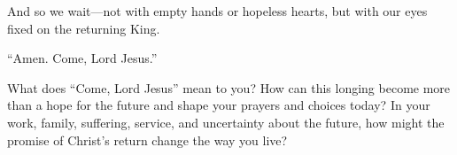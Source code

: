 And so we wait—not with empty hands or hopeless hearts, but with our eyes fixed on the returning King.

``Amen. Come, Lord Jesus.''

\begin{ReaderQuestion}
What does ``Come, Lord Jesus'' mean to you? How can this longing become more than a hope for the future and shape your prayers and choices today? In your work, family, suffering, service, and uncertainty about the future, how might the promise of Christ's return change the way you live?
\end{ReaderQuestion}
